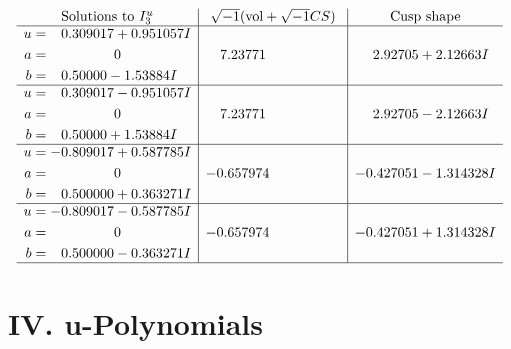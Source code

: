 \documentclass[1p]{elsarticle_modified}
\theoremstyle{definition}
\newcommand{\I}{\sqrt{-1}}
\begin{document}
$$\begin{array}{c|c|c}  
\text{Solutions to }I^u_{3}& \I (\text{vol} + \sqrt{-1}CS) & \text{Cusp shape}\\
 \hline 
\begin{aligned}
u &= \phantom{-}0.309017 + 0.951057 I \\
a &= \phantom{-0.000000 } 0 \\
b &= \phantom{-}0.50000 - 1.53884 I\end{aligned}
 & \phantom{-}7.23771\phantom{ +0.000000I} & \phantom{-}2.92705 + 2.12663 I \\ \hline\begin{aligned}
u &= \phantom{-}0.309017 - 0.951057 I \\
a &= \phantom{-0.000000 } 0 \\
b &= \phantom{-}0.50000 + 1.53884 I\end{aligned}
 & \phantom{-}7.23771\phantom{ +0.000000I} & \phantom{-}2.92705 - 2.12663 I \\ \hline\begin{aligned}
u &= -0.809017 + 0.587785 I \\
a &= \phantom{-0.000000 } 0 \\
b &= \phantom{-}0.500000 + 0.363271 I\end{aligned}
 & -0.657974\phantom{ +0.000000I} & -0.427051 - 1.314328 I \\ \hline\begin{aligned}
u &= -0.809017 - 0.587785 I \\
a &= \phantom{-0.000000 } 0 \\
b &= \phantom{-}0.500000 - 0.363271 I\end{aligned}
 & -0.657974\phantom{ +0.000000I} & -0.427051 + 1.314328 I\\
 \hline 
 \end{array}$$\newpage
\newpage\renewcommand{\arraystretch}{1}
\centering \section*{ IV. u-Polynomials}
\end{document}
